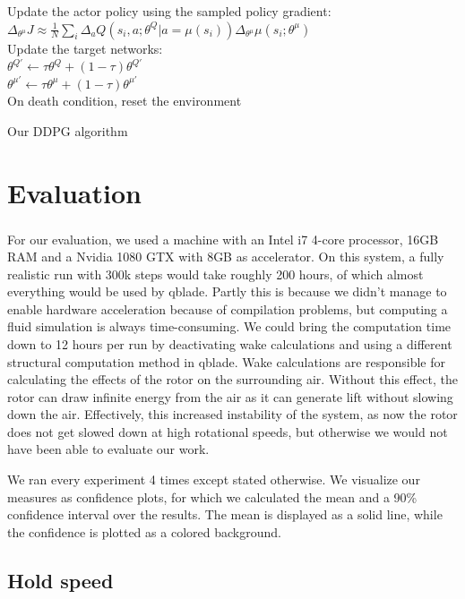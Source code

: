 \documentclass[hyperref,beleg]{cgvpub}
\begin{document}
\begin{algorithm}
{{    Update the actor policy using the sampled policy gradient: $\Delta_{\theta^{\mu}} J \approx \frac{1}{N} \sum_{i} \Delta_a Q(s_i, a;\theta^Q | a=\mu(s_i)) \Delta_{\theta^{\mu}}\mu(s_i;\theta^{\mu})$\\
    Update the target networks:\\
    $\theta^{Q'} \leftarrow \tau \theta^{Q} + (1-\tau)\theta^{Q'}$\\
    $\theta^{\mu'} \leftarrow \tau \theta^{\mu} + (1-\tau)\theta^{\mu'}$\\
    On death condition, reset the environment
  }
}
\caption{Our DDPG algorithm}
\label{alg:ourddpg}
\end{algorithm}

\chapter{Evaluation}

For our evaluation, we used a machine with an Intel\textsuperscript{\textregistered} i7 4-core processor, 16GB RAM and a Nvidia 1080 GTX with 8GB as accelerator. On this system, a fully realistic run with 300k steps would take roughly 200 hours, of which almost everything would be used by qblade. Partly this is because we didn't manage to enable hardware acceleration because of compilation problems, but computing a fluid simulation is always time-consuming. We could bring the computation time down to 12 hours per run by deactivating wake calculations and using a different structural computation method in qblade. Wake calculations are responsible for calculating the effects of the rotor on the surrounding air. Without this effect, the rotor can draw infinite energy from the air as it can generate lift without slowing down the air. Effectively, this increased instability of the system, as now the rotor does not get slowed down at high rotational speeds, but otherwise we would not have been able to evaluate our work.

We ran every experiment 4 times except stated otherwise. We visualize our measures as confidence plots, for which we calculated the mean and a 90\% confidence interval over the results. The mean is displayed as a solid line, while the confidence is plotted as a colored background. 

\section{Hold speed}
\end{document}
